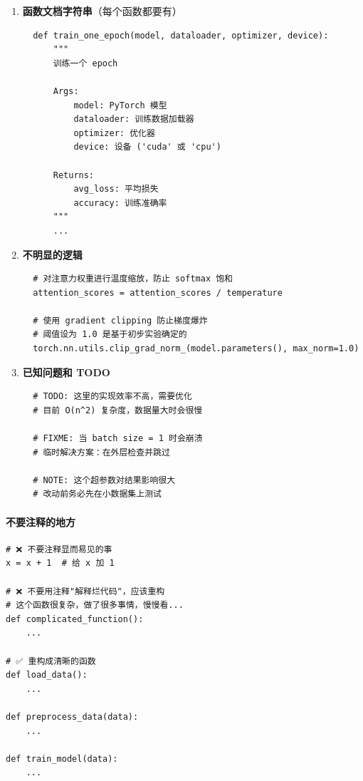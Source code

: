 \begin{enumerate}
  \item \textbf{函数文档字符串}（每个函数都要有）
  \begin{verbatim}
  def train_one_epoch(model, dataloader, optimizer, device):
      """
      训练一个 epoch

      Args:
          model: PyTorch 模型
          dataloader: 训练数据加载器
          optimizer: 优化器
          device: 设备 ('cuda' 或 'cpu')

      Returns:
          avg_loss: 平均损失
          accuracy: 训练准确率
      """
      ...
  \end{verbatim}

  \item \textbf{不明显的逻辑}
  \begin{verbatim}
  # 对注意力权重进行温度缩放，防止 softmax 饱和
  attention_scores = attention_scores / temperature

  # 使用 gradient clipping 防止梯度爆炸
  # 阈值设为 1.0 是基于初步实验确定的
  torch.nn.utils.clip_grad_norm_(model.parameters(), max_norm=1.0)
  \end{verbatim}

  \item \textbf{已知问题和 TODO}
  \begin{verbatim}
  # TODO: 这里的实现效率不高，需要优化
  # 目前 O(n^2) 复杂度，数据量大时会很慢

  # FIXME: 当 batch size = 1 时会崩溃
  # 临时解决方案：在外层检查并跳过

  # NOTE: 这个超参数对结果影响很大
  # 改动前务必先在小数据集上测试
  \end{verbatim}
\end{enumerate}

\paragraph{不要注释的地方}

\begin{verbatim}
# ❌ 不要注释显而易见的事
x = x + 1  # 给 x 加 1

# ❌ 不要用注释"解释烂代码"，应该重构
# 这个函数很复杂，做了很多事情，慢慢看...
def complicated_function():
    ...

# ✅ 重构成清晰的函数
def load_data():
    ...

def preprocess_data(data):
    ...

def train_model(data):
    ...
\end{verbatim}

